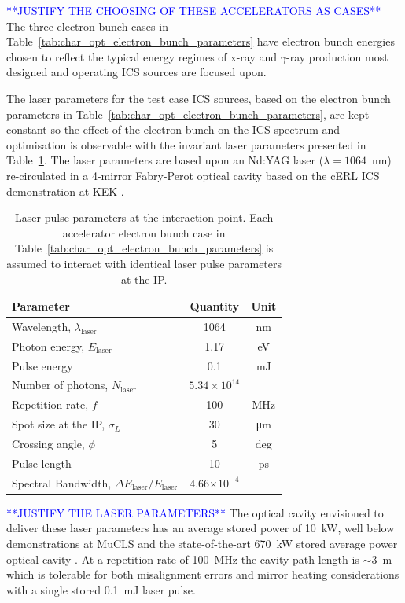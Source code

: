 \documentclass[../main.tex]{subfiles}
\begin{document}
\textcolor{blue}{**JUSTIFY THE CHOOSING OF THESE ACCELERATORS AS CASES**}
The three electron bunch cases in Table~\ref{tab:char_opt_electron_bunch_parameters} have electron bunch energies chosen to reflect the typical energy regimes of x-ray and $\gamma$-ray production most designed and operating ICS sources are focused upon. 

The laser parameters for the test case ICS sources, based on the electron bunch parameters in Table~\ref{tab:char_opt_electron_bunch_parameters}, are kept constant so the effect of the electron bunch on the ICS spectrum and optimisation is observable with the invariant laser parameters presented in Table~\ref{tab:char_opt_laser_pulse_parameters}. The laser parameters are based upon an Nd:YAG laser ($\lambda = 1064$~\si{\nano\meter}) re-circulated in a 4-mirror Fabry-Perot optical cavity based on the cERL ICS demonstration at KEK \cite{akagi2016narrow}. 

\begin{table}[!h]
\centering
\begin{tabular}{lcc}
\hline\hline
Parameter & Quantity & Unit \\
\hline
Wavelength, $\lambda_\textrm{laser}$ & 1064 & nm\\
Photon energy, $E_\textrm{laser}$ & 1.17 & eV\\
Pulse energy  & 0.1 & \si{\milli\joule}\\
Number of photons, $N_{\textrm{laser}}$ & $5.34\times 10^{14}$\\ 
Repetition rate, $f$ & 100 & MHz\\
Spot size at the IP, $\sigma_{L}$ & 30 & \si{\micro\meter}\\
Crossing angle, $\phi$ & 5 & deg \\
Pulse length  & 10 & ps\\
Spectral Bandwidth, $\Delta E_\textrm{laser}/E_\textrm{laser}$ & 4.66$\times 10^{-4}$ &   \\
\hline\hline
\end{tabular}
\caption{Laser pulse parameters at the interaction point. Each accelerator electron bunch case in Table~\ref{tab:char_opt_electron_bunch_parameters} is assumed to interact with identical laser pulse parameters at the IP.}
\label{tab:char_opt_laser_pulse_parameters}
\end{table}

\textcolor{blue}{**JUSTIFY THE LASER PARAMETERS**}
The optical cavity envisioned to deliver these laser parameters has an average stored power of 10~\si{\kilo\watt}, well below demonstrations at MuCLS \cite{eggl2016munich} and the state-of-the-art 670~\si{\kilo\watt} stored average power optical cavity \cite{carstens2014megawatt}. At a repetition rate of 100~\si{\mega\hertz} the cavity path length is $\sim3$~\si{\meter} which is tolerable for both misalignment errors and mirror heating considerations with a single stored 0.1~\si{\milli\joule} laser pulse.
\end{document}
